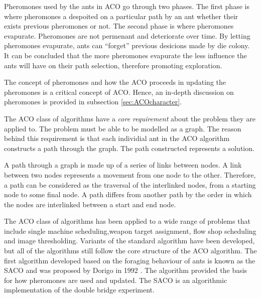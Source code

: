 Pheromones used by the ants in \gls{ACO} go through two phases. The first phase is where pheromones a despoited on a particular path by an ant whether their exists previous pheromones or not. The second phase is where pheromones evapurate. Pheromones are not permenant and deteriorate over time\cite{FundamentalSwarm}. By letting pheromones evapurate, ants can ``forget'' previous desicions made by die colony\cite{FundamentalSwarm}. It can be concluded that the more pheromones evapurate the less influence the ants will have on their path selection, therefore promoting exploration\cite{FundamentalSwarm}.

The concept of pheromones and how the \gls{ACO} proceeds in updating the pheromones is a critical concept of \gls{ACO}. Hence, an in-depth discussion on pheromones is provided in subsection \ref{sec:ACOcharacter}.

The \gls{ACO} class of algorithms have a \emph{core requirement} about the problem they are applied to\cite{FundamentalSwarm}. The problem must be able to be modelled as a graph. The reason behind this requirement is that each individial ant in the \gls{ACO} algorithm constructs a path through the graph\cite{FundamentalSwarm}. The path constructed represents a solution.

A path through a graph is made up of a series of links between nodes\cite{AIModernApproach,DataStructuresJava}. A link between two nodes represents a movement from one node to the other\cite{AIModernApproach,DataStructuresJava}. Therefore, a path can be considered as the traversal of the interlinked nodes, from a starting node to some final node\cite{AIModernApproach,DataStructuresJava}. A path differs from another path by the order in which the nodes are interlinked between a start and end node\cite{AIModernApproach,DataStructuresJava}.

 The \gls{ACO} class of algorithms has been applied to a wide range of problems that include single machine scheduling\cite{ACOSingleMachine},weapon target assignment\cite{WeaponTargetACO}, flow shop scheduling\cite{ACOFlowShop} and image thresholding\cite{ACOImageThreshold}. Variants of the standard algorithm have been developed, but all of the algorithms still follow the core structure of the \gls{ACO} algorithm\cite{CompuIntelligenceIntro,FundamentalSwarm}.
The first algorithm developed based on the foraging behaviour of ants is known as the \gls{SACO} and was proposed by Dorigo in 1992 \cite{CompuIntelligenceIntro}. The algorithm provided the basis for how pheromones are used and updated. The \gls{SACO} is an algorithmic implementation of the double bridge experiment.


